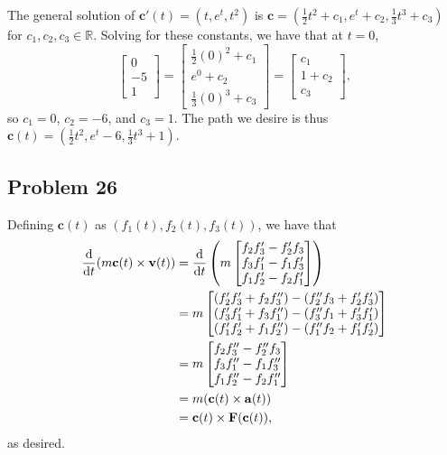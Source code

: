 \documentclass[11pt]{article}
\renewcommand{\vec}[1]{\mathbf{#1}}
\begin{document}
The general solution of $\vec{c}'(t) = (t, e^{t}, t^{2})$ is $\vec{c} = (\tfrac{1}{2}t^{2} + c_{1}, e^{t} + c_{2}, \tfrac{1}{3}t^{3} + c_{3})$ for $c_{1}, c_{2}, c_{3} \in \mathbb{R}$. Solving for these constants, we have that at $t = 0$,
\[
	\begin{bmatrix} 0 \\ -5 \\ 1 \end{bmatrix} = \begin{bmatrix} \tfrac{1}{2}(0)^{2} + c_{1} \\ e^{0} + c_{2} \\ \tfrac{1}{3}(0)^{3} + c_{3}  \end{bmatrix} = \begin{bmatrix} c_{1} \\ 1 + c_{2} \\ c_{3} \end{bmatrix},
\]
so $c_{1} = 0$, $c_{2} = -6$, and $c_{3} = 1$. The path we desire is thus $\boxed{\vec{c}(t) = \left(\tfrac{1}{2}t^{2}, e^{t} - 6, \tfrac{1}{3}t^{3} + 1\right)}$.


\subsection*{Problem 26}

Defining $\vec{c}(t)$ as $(f_{1}(t), f_{2}(t), f_{3}(t))$, we have that
\begin{align*}
	\dv{t} (m \vec{c}(t) \times \vec{v}(t)) &= \dv{t} \left(m \begin{bmatrix} f_{2} f_{3}' - f_{2}'f_{3} \\ f_{3} f_{1}' - f_{1} f_{3}' \\ f_{1} f_{2}' - f_{2} f_{1}' \end{bmatrix}\right) \\
	&= m \begin{bmatrix} (f_{2}' f_{3}' + f_{2} f_{3}'') - (f_{2}'' f_{3} + f_{2}' f_{3}') \\ (f_{3}' f_{1}' + f_{3} f_{1}'') - (f_{3}'' f_{1} + f_{3}' f_{1}') \\ (f_{1}' f_{2}' + f_{1} f_{2}'') - (f_{1}'' f_{2} + f_{1}' f_{2}') \\ \end{bmatrix} \\
	&= m \begin{bmatrix} f_{2} f_{3}'' - f_{2}''f_{3} \\ f_{3} f_{1}'' - f_{1} f_{3}'' \\ f_{1} f_{2}'' - f_{2} f_{1}'' \end{bmatrix} \\
	&= m(\vec{c}(t) \times \vec{a}(t)) \\
	&= \vec{c}(t) \times \vec{F}(\vec{c}(t)),
\end{align*}
as desired.

\end{document}
